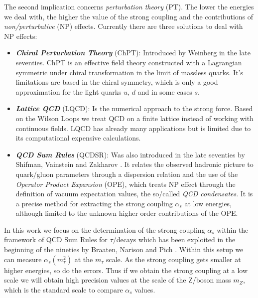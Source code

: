 \documentclass[../../index.tex]{subfiles}
\begin{document}
The second implication concerns \textit{perturbation theory} (PT). The lower
the energies we deal with, the higher the value of the strong coupling and the
contributions of \textit{non\-/perturbative} (NP) effects. Currently there are
three solutions to deal with NP effects:
\begin{itemize}
  \item \textbf{\textit{Chiral Perturbation Theory}} (ChPT): Introduced by Weinberg
    \cite{Weinberg1978} in the late seventies. ChPT is an effective field theory
    constructed with a Lagrangian symmetric under chiral transformation in the
    limit of massless quarks. It's limitations are based in the chiral symmetry,
    which is only a good approximation for the light quarks $u$, $d$ and in some
    cases $s$.
  \item \textbf{\textit{Lattice QCD}} (LQCD): Is the numerical approach to the strong
    force. Based on the Wilson Loops \cite{Wilson1974} we treat QCD on a finite
    lattice instead of working with continuous fields. LQCD has already many applications but
    is limited due to its computational expensive calculations.
  \item \textbf{\textit{QCD Sum Rules}} (QCDSR): Was also introduced in the late seventies by
    Shifman, Vainstein and Zakharov \cite{Shifman1978,Shifman1978a}. It relates
    the observed hadronic picture to quark\-/gluon parameters through a dispersion
    relation and the use of the \textit{Operator Product Expansion} (OPE), which
    treats NP effect through the definition of vacuum expectation values, the
    so\-/called \textit{QCD condensates}. It is a precise method for extracting
    the strong coupling $\alpha_s$ at low energies, although limited to
    the unknown higher order contributions of the OPE.
\end{itemize}

In this work we focus on the determination of the strong coupling $\alpha_s$
within the framework of QCD Sum Rules for $\tau$\-/decays which has been
exploited in the beginning of the nineties by Braaten, Narison and Pich \cite{Braaten1991}. Within this setup we
can measure $\alpha_s(m_\tau^2)$ at the $m_\tau$ scale. As the strong coupling
gets smaller at higher energies, so do the errors. Thus if we obtain the strong
coupling at a low scale we will obtain high precision values at the scale of the
Z\-/boson mass $m_Z$, which is the standard scale to compare $\alpha_s$ values.
\end{document}
